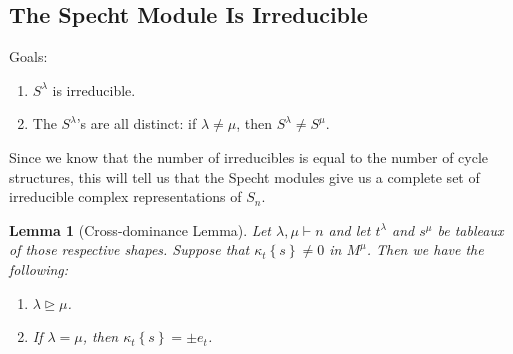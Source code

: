 \documentclass[12pt]{article}
\newcommand\setb[1]{\left \{ #1 \right \}}
\newtheorem{lemma}[theorem]{Lemma}
\theoremstyle{definition}
\begin{document}
\subsection{The Specht Module Is Irreducible}
Goals:
\begin{enumerate}
    \item $S^{\lambda}$ is irreducible.
    \item The $S^{\lambda}$'s are all distinct: if $\lambda \neq \mu$, then $S^{\lambda} \neq S^{\mu}$.
\end{enumerate}
Since we know that the number of irreducibles is equal to the number of cycle structures, this will tell us that the Specht modules give us a complete set of irreducible complex representations of $S_n$.
\begin{lemma}[Cross-dominance Lemma]
    Let $\lambda , \mu \vdash n$ and let $t^{\lambda}$ and $s^{\mu}$ be tableaux of those respective shapes. Suppose that $\kappa_t \setb{ s } \neq 0$ in $M^{\mu}$. Then we have the following:
    \begin{enumerate}
        \item $\lambda \trianglerighteq \mu$.
        \item If $\lambda = \mu$, then $\kappa_t \setb{s} = \pm e_t$.
    \end{enumerate}
\end{lemma}
\end{document}
